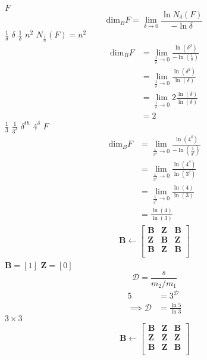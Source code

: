 \documentclass{article}
\begin{document}
$F$
\begin{equation*}
\text{dim}_BF = \lim_{\delta \to 0} \frac{\ln N_\delta(F)}{-\ln \delta}
\end{equation*}
$\frac{1}{\delta}$
$\delta$
$\frac{1}{\delta}$
$n^2$
$N_{\frac{1}{n}}(F) = n^2$
\begin{align*}
\text{dim}_BF &= \lim_{\frac{1}{\delta} \to 0} \frac{\ln(\delta^2)}{-\ln(\frac{1}{\delta})}\\
&= \lim_{\frac{1}{\delta} \to 0} \frac{\ln(\delta^2)}{\ln(\delta)}\\
&= \lim_{\frac{1}{\delta} \to 0} 2\frac{\ln(\delta)}{\ln(\delta)}\\
&= 2
\end{align*}
$\frac{1}{3}$
$\frac{1}{3^{\delta}}$
$\delta^{th}$
$4^{\delta}$
$F$
\begin{align*}
\text{dim}_BF &= \lim_{\frac{1}{3^{\delta}} \to 0} \frac{\ln(4^{\delta})}{-\ln(\frac{1}{3^{\delta}})}\\
&= \lim_{\frac{1}{3^{\delta}} \to 0} \frac{\ln(4^{\delta})}{\ln(3^{\delta})}\\
&= \lim_{\frac{1}{3^{\delta}} \to 0} \frac{\ln(4)}{\ln(3)}\\
&= \frac{\ln(4)}{\ln(3)}
\end{align*}
\begin{align}
\mathbf{B} \leftarrow
   \begin{bmatrix}
       \mathbf{B} & \mathbf{Z} & \mathbf{B} \\
       \mathbf{Z} & \mathbf{B} & \mathbf{Z} \\
       \mathbf{B} & \mathbf{Z} & \mathbf{B} \\
   \end{bmatrix} \label{eq:visek-iter}
\end{align}
$\mathbf{B}= \left[ 1 \right]$
$\mathbf{Z}= \left[ 0 \right]  $
\[
\mathcal{D} = \frac{s}{m_{2}/m_{1}}
\]
\begin{align}
5 &= 3^{\mathcal{D}} \nonumber \\
\implies \mathcal{D} &= \frac{\ln 5}{\ln 3} \label{eq:vic-dim-val}
\end{align}
$3 \times 3$
\begin{align}
 \mathbf{B} \leftarrow
 \begin{bmatrix}
    \mathbf{B} & \mathbf{Z} & \mathbf{B} \\
    \mathbf{Z} & \mathbf{Z} & \mathbf{Z} \\
    \mathbf{B} & \mathbf{Z} & \mathbf{B} \\
\end{bmatrix}
\end{align}
\end{document}
